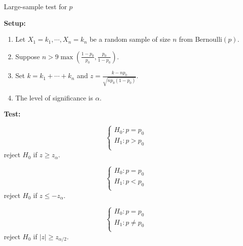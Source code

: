 \begin{frame}{Large-sample test for $p$}

{\bf Setup:~}
\begin{enumerate}
 \item Let $X_1=k_1,\cdots,X_n=k_n$ be a random sample of size $n$ from Bernoulli$(p)$.
 \item Suppose $n> 9 \max\left(\frac{1-p_0}{p_0},\frac{p_0}{1-p_0}\right)$.
 \item Set $k=k_1+\cdots+k_n$ and $z=\frac{k-np_0}{\sqrt{np_0(1-p_0)}}$.
 \item The level of significance is $\alpha$.
\end{enumerate}
\pause
\vfill
{\bf Test:}\\
\begin{minipage}{0.3\textwidth}
 \[
 \begin{cases}
  H_0: p= p_0 \\
  H_1: p> p_0 \\
 \end{cases}
 \]
 reject $H_0$ if $z\ge z_\alpha$.
\end{minipage}
\hfill
\begin{minipage}{0.3\textwidth}
 \[
 \begin{cases}
  H_0: p= p_0 \\
  H_1: p< p_0 \\
 \end{cases}
 \]
 reject $H_0$ if $z\le -z_\alpha$.
\end{minipage}
\hfill
\begin{minipage}{0.3\textwidth}
 \[
 \begin{cases}
  H_0: p= p_0 \\
  H_1: p\ne p_0 \\
 \end{cases}
  \]
  reject $H_0$ if $|z| \ge z_{\alpha/2}$.
\end{minipage}

\end{frame}
